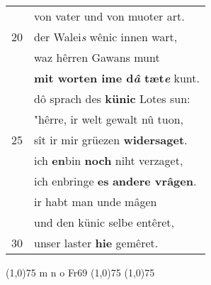 \documentclass[8pt,a4paper,notitlepage]{article}
\begin{document}
\begin{table}[ht]
\begin{minipage}[t]{0.5\linewidth}
\begin{tabular}{rl}
 & von vater und von muoter art.\\ 
20 & der Walei\textit{s} wênic innen wart,\\ 
 & waz hêrren Gawans munt\\ 
 & \textbf{mit worten ime d\textit{â} tæt\textit{e}} kunt.\\ 
 & dô sprach des \textbf{künic} Lotes sun:\\ 
 & "hêrre, ir welt gewalt nû tuon,\\ 
25 & sît ir mir grüezen \textbf{widersaget}.\\ 
 & ich \textbf{en}bin \textbf{noch} niht verzaget,\\ 
 & ich enbringe \textbf{es} \textbf{andere vrâgen}.\\ 
 & ir habt man unde mâgen\\ 
 & und den künic selbe entêret,\\ 
30 & unser laster \textbf{hie} gemêret.\\ 
\end{tabular}
\scriptsize
\line(1,0){75} \newline
m n o Fr69 \newline
\line(1,0){75} \newline
\newline
\line(1,0){75} \newline

\end{minipage}
\end{table}
\end{document}
